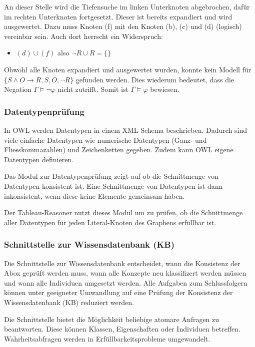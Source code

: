 An dieser Stelle wird die Tiefensuche im linken Unterknoten abgebrochen, dafür im rechten Unterknoten fortgesetzt. Dieser ist bereits expandiert und wird ausgewertet. Dazu muss Knoten (f) mit den Knoten (b), (c) und (d) (logisch) vereinbar sein. Auch dort herrscht ein Widerspruch:
\begin{itemize}
    \item $(d) \cup (f)$ also $\neg R \cup R = \{\}$
\end{itemize}

Obwohl alle Knoten expandiert und ausgewertet wurden,  konnte kein Modell für $\{S \wedge O \rightarrow R, S, O, \neg R\}$ gefunden werden. Dies wiederum bedeutet, dass die Negation $\Gamma \models \neg\varphi$ nicht zutrifft. Somit ist $\Gamma \models \varphi$ bewiesen.

\subsubsection{Datentypenprüfung}
\label{ssubsection:inferenz_pellet_datatypes}
In OWL werden Datentypen in einem XML-Schema beschrieben. Dadurch sind viele einfache Datentypen wie numerische Datentypen (Ganz- und Fliesskommazahlen) und Zeichenketten gegeben. Zudem kann OWL eigene Datentypen definieren.

Das Modul zur Datentypenprüfung zeigt auf ob die Schnittmenge von Datentypen konsistent ist. Eine Schnittmenge von Datentypen ist dann inkonsistent, wenn diese keine Elemente gemeinsam haben.

Der Tableau-Reasoner nutzt dieses Modul um zu prüfen, ob die Schnittmenge aller Datentypen für jeden Literal-Knoten des Graphens erfüllbar ist.

\subsubsection{Schnittstelle zur Wissensdatenbank (KB)}
\label{ssubsection:inferenz_pellet_kb}
Die Schnittstelle zur Wissensdatenbank entscheidet, wann die Konsistenz der Abox geprüft werden muss, wann alle Konzepte neu klassifizert werden müssen und wann alle Individuen umgesetzt werden. Alle Aufgaben zum Schlussfolgern können unter geeigneter Umwandlung auf eine Prüfung der Konsistenz der Wissensdatenbank (KB) reduziert werden.

Die Schnittstelle bietet die Möglichkeit beliebige atomare Anfragen zu beantworten. Diese können Klassen, Eigenschaften oder Individuen betreffen. Wahrheitsabfragen werden in Erfüllbarkeitsprobleme umgewandelt.

